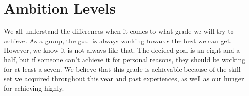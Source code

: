\section{Ambition Levels}
We all understand the differences when it comes to what grade we will try to achieve. As a group, the goal is always working towards the best we can get. However, we know it is not always like that. The decided goal is an eight and a half, but if someone can’t achieve it for personal reasons, they should be working for at least a seven. We believe that this grade is achievable because of the skill set we acquired throughout this year and past experiences, as well as our hunger for achieving highly.
